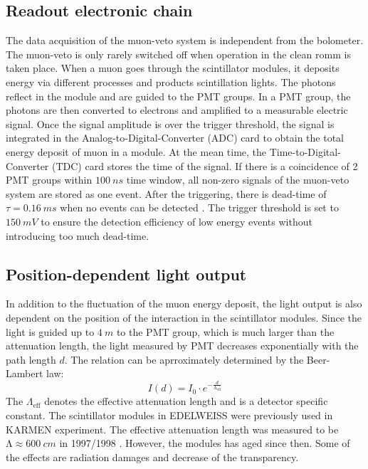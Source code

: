 \subsection{Readout electronic chain}
The data acquisition of the muon-veto system is independent from the bolometer. The muon-veto is only rarely switched off when operation in the clean romm is taken place.
When a muon goes through the scintillator modules, it deposits energy via different processes and products scintillation lights. The photons reflect in the module and are guided to the PMT groups. In a PMT group, the photons are then converted to electrons and amplified to a measurable electric signal. Once the signal amplitude is over the trigger threshold, the signal is integrated in the Analog-to-Digital-Converter (ADC) card to obtain the total energy deposit of muon in a module. At the mean time, the Time-to-Digital-Converter (TDC) card stores the time of the signal. If there is a coincidence of 2 PMT groups within $\SI{100}{ns}$ time window, all non-zero signals of the muon-veto system are stored as one event. After the triggering, there is dead-time of $\tau=\SI{0.16}{ms}$ when no events can be detected \cite{Sch13b}. The trigger threshold is set to $\SI{150}{mV}$ to ensure the detection efficiency of low energy events without introducing too much dead-time.

\subsection{Position-dependent light output}
In addition to the fluctuation of the muon energy deposit, the light output is also dependent on the position of the interaction in the scintillator modules. Since the light is guided up to $\SI{4}{m}$ to the PMT group, which is much larger than the attenuation length, the light measured by PMT decreases exponentially with the path length $d$. The relation can be aprroximately determined by the Beer-Lambert law:
\begin{equation}
  I(d)=I_{0}\cdot e^{-\frac{d}{\mathrm{\Lambda}_{\mathrm{eff}}}}
\end{equation}
The $\Lambda_{\mathrm{eff}}$ denotes the effective attenuation length and is a detector specific constant.
The scintillator modules in EDELWEISS were previously used in KARMEN experiment. The effective attenuation length was measured to be $\mathrm{\Lambda} \approx \SI{600}{cm}$ in 1997/1998 \cite{Rei98}. However, the modules has aged since then. Some of the effects are radiation damages and decrease of the transparency.

